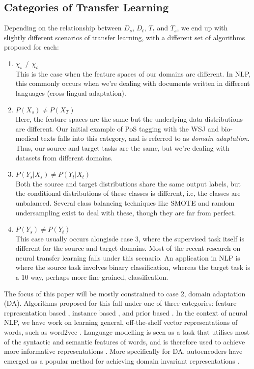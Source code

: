 \documentclass[12pt]{report}
\begin{document}
	\subsection{Categories of Transfer Learning}
	Depending on the relationship between $D_{s},\, D_{t},\, T_{t}$ and $T_{s}$, we end up with slightly different scenarios of transfer learning, with a  different set of algorithms proposed for each:
	\begin{enumerate}
		\item \textbf{$\chi_{s} \neq \chi_{t}$} \\ This is the case when the feature spaces of our domains are different. In NLP, this commonly occurs when we're dealing with documents written in different languages (cross-lingual adaptation).
		\item \textbf{$P(X_{s}) \neq P(X_{T})$ }\\Here, the feature spaces are the same but the underlying data distributions are different. Our initial example of PoS tagging with the WSJ and bio-medical texts falls into this category, and is referred to as \textit{domain adaptation}. Thus, our source and target tasks are the same, but we're dealing with datasets from different domains. 
		\item $P(Y_{s}|X_{s}) \neq P(Y_{t}|X_{t})$ \\
		Both the source and target distributions share the same output labels, but the conditional distributions of these classes is different, i.e, the classes are unbalanced. Several class balancing techniques like SMOTE and random undersampling exist to deal with these, though they are far from perfect.
		\item $P(Y_{s}) \neq P(Y_{t})$ \\
		This case usually occurs alongisde case 3, where the supervised task itself is different for the source and target domains. Most of the recent research on neural transfer learning falls under this scenario. An application in NLP is where the source task involves binary classification, whereas the target task is a 10-way, perhaps more fine-grained, classification.
	\end{enumerate}
	The focus of this paper will be mostly constrained to case 2, domain adaptation (DA). Algorithms proposed for this fall under one of three categories: feature representation based \citep{daume2007frustratingly} \citep{collobert2008unified} \citep{blitzer2006domain}, instance  based \citep{xu2011instance} \citep{jiang2007instance} \citep{ruder2017learning} , and prior based \citep{chelba2006adaptation} \citep{finkel2009hierarchical}. In the context of neural NLP, we have work on learning general, off-the-shelf vector representations of words, such as word2vec \citep{mikolov2013distributed}. Language modelling is seen as a task that utilises most of the syntactic and semantic features of words, and is therefore used to achieve more informative representations \citep{devlin2018bert} \citep{peters2018deep}. More specifically for DA, autoencoders have emerged as a popular method for achieving domain invariant representations \citep{yu2016learning} \citep{chen2012marginalized}. 
\end{document}
